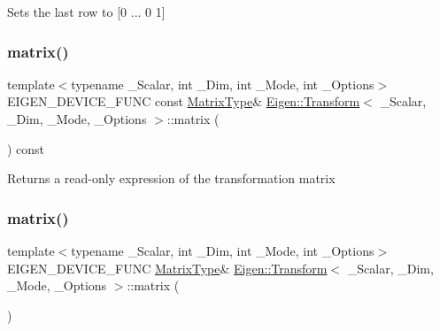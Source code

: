Sets the last row to \mbox{[}0 ... 0 1\mbox{]} \mbox{\label{class_eigen_1_1_transform_aec8168000a88a807130d41020af98d47}} 
\subsubsection{\texorpdfstring{matrix()}{matrix()}\hspace{0.1cm}{\footnotesize\ttfamily [1/2]}}
{\footnotesize\ttfamily template$<$typename \+\_\+\+Scalar, int \+\_\+\+Dim, int \+\_\+\+Mode, int \+\_\+\+Options$>$ \\
E\+I\+G\+E\+N\+\_\+\+D\+E\+V\+I\+C\+E\+\_\+\+F\+U\+NC const \mbox{\hyperlink{class_eigen_1_1_transform_a30f72ba46abc2bb3c7fa919c1078fc9c}{Matrix\+Type}}\& \mbox{\hyperlink{class_eigen_1_1_transform}{Eigen\+::\+Transform}}$<$ \+\_\+\+Scalar, \+\_\+\+Dim, \+\_\+\+Mode, \+\_\+\+Options $>$\+::matrix (\begin{DoxyParamCaption}{ }\end{DoxyParamCaption}) const\hspace{0.3cm}{\ttfamily [inline]}}

\begin{DoxyReturn}{Returns}
a read-\/only expression of the transformation matrix 
\end{DoxyReturn}
\mbox{\label{class_eigen_1_1_transform_aee6c4863933d3660e56e3333e0506cc2}} 
\subsubsection{\texorpdfstring{matrix()}{matrix()}\hspace{0.1cm}{\footnotesize\ttfamily [2/2]}}
{\footnotesize\ttfamily template$<$typename \+\_\+\+Scalar, int \+\_\+\+Dim, int \+\_\+\+Mode, int \+\_\+\+Options$>$ \\
E\+I\+G\+E\+N\+\_\+\+D\+E\+V\+I\+C\+E\+\_\+\+F\+U\+NC \mbox{\hyperlink{class_eigen_1_1_transform_a30f72ba46abc2bb3c7fa919c1078fc9c}{Matrix\+Type}}\& \mbox{\hyperlink{class_eigen_1_1_transform}{Eigen\+::\+Transform}}$<$ \+\_\+\+Scalar, \+\_\+\+Dim, \+\_\+\+Mode, \+\_\+\+Options $>$\+::matrix (\begin{DoxyParamCaption}{ }\end{DoxyParamCaption})\hspace{0.3cm}{\ttfamily [inline]}}


